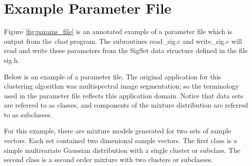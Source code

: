 \documentclass[12pt]{article}
\begin{document}
\newpage
\section{Example Parameter File} 
\label{sec:params_file}


Figure \ref{fig:params_file}
is an annotated example of a parameter file which
is output from the {\em clust} program.
The subroutines read\_sig.c and write\_sig.c will 
read and write these parameters from the SigSet data structure
defined in the file sig.h.

Below is an example of a parameter file.
The original application for this clustering algorithm
was multispectral image segmentation; 
so the terminology used in the parameter file
reflects this application domain.
Notice that data sets are referred to as classes,
and components of the mixture distribution are referred
to as subclasses.

For this example, there are mixture models generated
for two sets of sample vectors.
Each set contained two dimenional sample vectors.
The first class is a simple multivariate
Gaussian distribution with a single cluster or subclass. 
The second class 
is a second order mixture with two clusters or subclasses. 
\end{document}
